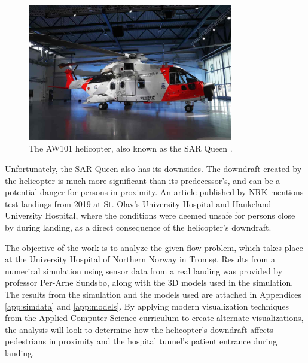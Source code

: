 \documentclass[a4paper,11pt]{extarticle}
\begin{document}
\begin{figure}[H]
  \centering
  \includegraphics[width=0.8\textwidth]{gfx/sar_queen.jpg}
  \caption{The AW101 helicopter, also known as the SAR Queen \citep{AW101}.}
  \label{fig:SarQueen}
\end{figure}

Unfortunately, the SAR Queen also has its downsides. The downdraft created by the helicopter is much more significant than its predecessor's, and can be a potential danger for persons in proximity. An article published by NRK \citep{NRK:SarQueen} mentions test landings from 2019 at St. Olav's University Hospital and Haukeland University Hospital, where the conditions were deemed unsafe for persons close by during landing, as a direct consequence of the helicopter's downdraft.

The objective of the work is to analyze the given flow problem, which takes place at the University Hospital of Northern Norway in Tromsø. Results from a numerical simulation using sensor data from a real landing was provided by professor Per-Arne Sundsbø, along with the 3D models used in the simulation. The results from the simulation and the models used are attached in Appendices \ref{app:simdata} and \ref{app:models}. By applying modern visualization techniques from the Applied Computer Science curriculum to create alternate visualizations, the analysis will look to determine how the helicopter's downdraft affects pedestrians in proximity and the hospital tunnel's patient entrance during landing.
\end{document}
